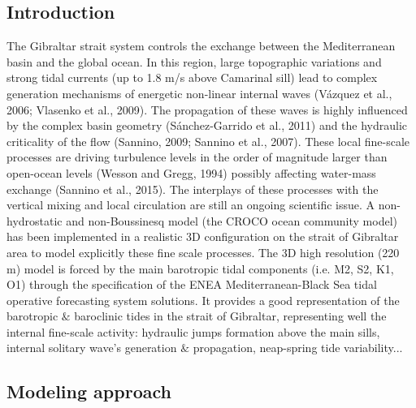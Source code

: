 

\vspace{\baselineskip}
\subsection{Introduction}

The Gibraltar strait system controls the exchange between the Mediterranean basin and the global ocean. In this region, large topographic variations and strong tidal currents (up to 1.8 m/s above Camarinal sill) lead to complex generation mechanisms of energetic non-linear internal waves (Vázquez et al., 2006; Vlasenko et al., 2009). The propagation of these waves is highly influenced by the complex basin geometry (Sánchez-Garrido et al., 2011) and the hydraulic criticality of the flow (Sannino, 2009; Sannino et al., 2007). These local fine-scale processes are driving turbulence levels in the order of magnitude larger than open-ocean levels (Wesson and Gregg, 1994) possibly affecting water-mass exchange (Sannino et al., 2015). The interplays of these processes with the vertical mixing and local circulation are still an ongoing scientific issue. A non-hydrostatic and non-Boussinesq model (the CROCO ocean community model) has been implemented in a realistic 3D configuration on the strait of Gibraltar area to model explicitly these fine scale processes. The 3D high resolution (220 m) model is forced by the main barotropic tidal components (i.e. M2, S2, K1, O1) through the specification of the ENEA Mediterranean-Black Sea tidal operative forecasting system solutions. It provides a good representation of the barotropic $\&$  baroclinic tides in the strait of Gibraltar, representing well the internal fine-scale activity: hydraulic jumps formation above the main sills, internal solitary wave’s generation $\&$ propagation, neap-spring tide variability... \par

\vspace{\baselineskip}
\subsection{Modeling approach}

\vspace{\baselineskip}

